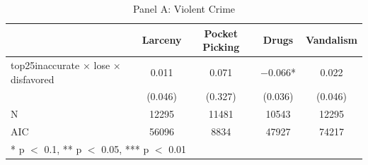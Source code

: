 \begin{table}
\centering
\caption{Panel A: Violent Crime}
\centering
\begin{tabular}[t]{lcccc}
\toprule
  & Larceny & Pocket Picking & Drugs & Vandalism\\
\midrule
top25inaccurate × lose × disfavored & \num{0.011} & \num{0.071} & \num{-0.066}* & \num{0.022}\\
 & (\num{0.046}) & (\num{0.327}) & (\num{0.036}) & (\num{0.046})\\
\midrule
N & \num{12295} & \num{11481} & \num{10543} & \num{12295}\\
AIC & \num{56096} & \num{8834} & \num{47927} & \num{74217}\\
\bottomrule
\multicolumn{5}{l}{\rule{0pt}{1em}* p $<$ 0.1, ** p $<$ 0.05, *** p $<$ 0.01}\\
\end{tabular}
\end{table}
